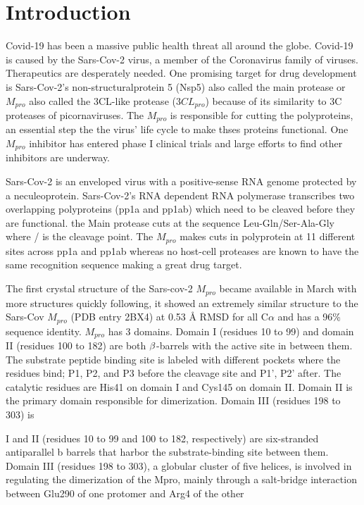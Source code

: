 \documentclass{biophys-new}
\begin{document}
\section*{Introduction}

Covid-19 has been a massive public health threat all around the globe. Covid-19 is caused by the Sars-Cov-2 virus, a member of the Coronavirus family of viruses. Therapeutics are desperately needed. One promising target for drug development is Sars-Cov-2's non-structuralprotein 5 (Nsp5) also called the main protease or $M_{pro}$ also called the 3CL-like protease ($3CL_{pro}$) because of its similarity to 3C proteases of picornaviruses\cite{tan2005ph}. The $M_{pro}$ is responsible for cutting the polyproteins, an essential step the the virus' life cycle to make thses proteins functional. One $M_{pro}$ inhibitor has entered phase I clinical trials and large efforts to find other inhibitors are underway.

Sars-Cov-2 is an enveloped virus with a positive-sense RNA genome protected by a neculeoprotein. Sars-Cov-2's RNA dependent RNA polymerase transcribes two overlapping polyproteins (pp1a and pp1ab) which need to be cleaved before they are functional. the Main protease cuts at the sequence Leu-Gln/Ser-Ala-Gly  where / is the cleavage point\cite{Zhang409}. The $M_{pro}$ makes cuts in polyprotein at 11 different sites across pp1a and pp1ab whereas no host-cell proteases are known to have the same recognition sequence making a great drug target\cite{hilgenfeld2014sars}. 

The first crystal structure of the Sars-cov-2 $M_{pro}$ became available in March \cite{Zhang409} with more structures quickly following\cite{owen2020sars}, it showed an extremely similar structure to the Sars-Cov $M_{pro}$ (PDB entry 2BX4)\cite{tan2005ph} at 0.53 Å RMSD for all C$\alpha$ and has a 96\% sequence identity. $M_{pro}$ has 3 domains. Domain I (residues 10 to 99) and domain II (residues 100 to 182) are both $\MakeUppercase{\beta}$-barrels with the active site in between them. The substrate peptide binding site is labeled with different pockets where the residues bind; P1, P2, and P3 before the cleavage site and P1', P2' after. The catalytic residues are His41 on domain I and Cys145 on domain II. Domain II is the primary domain responsible for dimerization. Domain III (residues 198 to 303) is 

I and II (residues 10 to 99 and 100 to 182,
respectively) are six-stranded antiparallel
b barrels that harbor the substrate-binding
site between them. Domain III (residues 198
to 303), a globular cluster of five helices, is
involved in regulating the dimerization of
the Mpro, mainly through a salt-bridge interaction between Glu290 of one protomer and
Arg4 of the other
\end{document}
